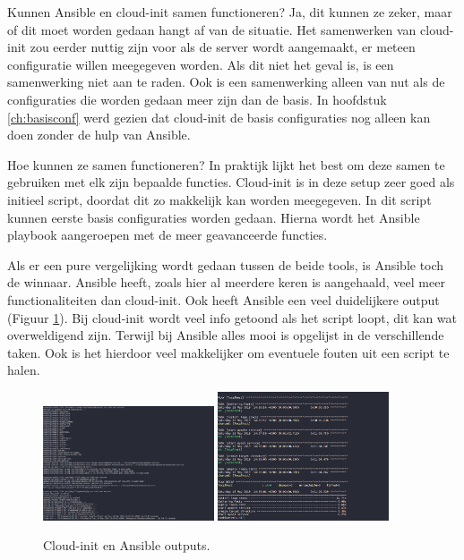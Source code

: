 \newpage
Kunnen Ansible en cloud-init samen functioneren? Ja, dit kunnen ze zeker, maar of dit moet worden gedaan hangt af van de situatie. Het samenwerken van cloud-init zou eerder nuttig zijn voor als de server wordt aangemaakt, er meteen configuratie willen meegegeven worden. Als dit niet het geval is, is een samenwerking niet aan te raden. Ook is een samenwerking alleen van nut als de configuraties die worden gedaan meer zijn dan de basis. In hoofdstuk \ref{ch:basisconf} werd gezien dat cloud-init de basis configuraties nog alleen kan doen zonder de hulp van Ansible.

Hoe kunnen ze samen functioneren? In praktijk lijkt het best om deze samen te gebruiken met elk zijn bepaalde functies. Cloud-init is in deze setup zeer goed als initieel script, doordat dit zo makkelijk kan worden meegegeven. In dit script kunnen eerste basis configuraties worden gedaan. Hierna wordt het Ansible playbook aangeroepen met de meer geavanceerde functies.

Als er een pure vergelijking wordt gedaan tussen de beide tools, is Ansible toch de winnaar. Ansible heeft, zoals hier al meerdere keren is aangehaald, veel meer functionaliteiten dan cloud-init. Ook heeft Ansible een veel duidelijkere output (Figuur \ref{fig:outputs}). Bij cloud-init wordt veel info getoond als het script loopt, dit kan wat overweldigend zijn. Terwijl bij Ansible alles mooi is opgelijst in de verschillende taken. Ook is het hierdoor veel makkelijker om eventuele fouten uit een script te halen.
\begin{figure}[!htb]
    \centering
    {{\includegraphics[width=0.45\textwidth]{img/cloudoutput.png} }}%
    \qquad
    {{\includegraphics[width=0.45\textwidth]{img/ansibleoutput.png} }}%
    \caption{Cloud-init en Ansible outputs.}%
    \label{fig:outputs}%
\end{figure}

